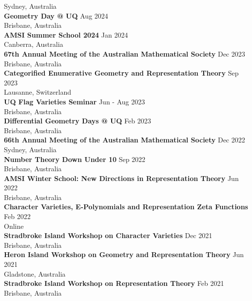 \documentclass[8pt]{amsart}
\begin{document}
\hfill Sydney, Australia \\
\textbf{Geometry Day @ UQ} \hfill Aug 2024 \\
\hfill Brisbane, Australia \\
\textbf{AMSI Summer School 2024} \hfill Jan 2024 \\
\hfill Canberra, Australia \\
\textbf{67th Annual Meeting of the Australian Mathematical Society} \hfill Dec 2023 \\
\hfill Brisbane, Australia \\
\textbf{Categorified Enumerative Geometry and Representation Theory} \hfill Sep 2023 \\
\hfill Lausanne, Switzerland \\
\textbf{UQ Flag Varieties Seminar} \hfill Jun - Aug 2023 \\
\hfill Brisbane, Australia \\
\textbf{Differential Geometry Days @ UQ} \hfill Feb 2023 \\
\hfill Brisbane, Australia \\
\textbf{66th Annual Meeting of the Australian Mathematical Society} \hfill Dec 2022 \\
\hfill Sydney, Australia \\
\textbf{Number Theory Down Under 10} \hfill Sep 2022 \\
\hfill Brisbane, Australia \\
\textbf{AMSI Winter School: New Directions in Representation Theory} \hfill Jun 2022 \\
\hfill Brisbane, Australia \\
\textbf{Character Varieties, E-Polynomials and Representation Zeta Functions} \hfill Feb 2022 \\
\hfill Online \\
\textbf{Stradbroke Island Workshop on Character Varieties} \hfill Dec 2021 \\
\hfill Brisbane, Australia \\
\textbf{Heron Island Workshop on Geometry and Representation Theory} \hfill Jun 2021 \\
\hfill Gladstone, Australia \\
\textbf{Stradbroke Island Workshop on Representation Theory} \hfill Feb 2021 \\
\hfill Brisbane, Australia 
\end{document}
